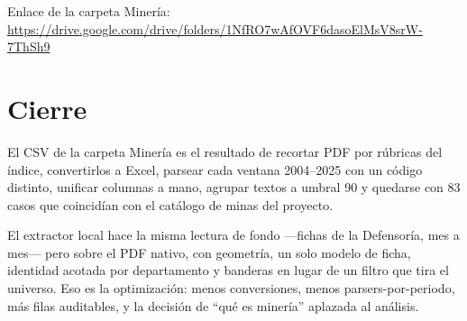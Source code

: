 \documentclass[11pt,a4paper]{article}
\begin{document}
Enlace de la carpeta Minería: \url{https://drive.google.com/drive/folders/1NfRO7wAfOVF6dasoElMsV8srW-7ThSh9}

\section{Cierre}

El CSV de la carpeta Minería es el resultado de recortar PDF por rúbricas del índice, convertirlos a Excel, parsear cada ventana 2004--2025 con un código distinto, unificar columnas a mano, agrupar textos a umbral 90 y quedarse con 83 casos que coincidían con el catálogo de minas del proyecto.

El extractor local hace la misma lectura de fondo ---fichas de la Defensoría, mes a mes--- pero sobre el PDF nativo, con geometría, un solo modelo de ficha, identidad acotada por departamento y banderas en lugar de un filtro que tira el universo. Eso es la optimización: menos conversiones, menos parsers-por-periodo, más filas auditables, y la decisión de ``qué es minería'' aplazada al análisis.
\end{document}
